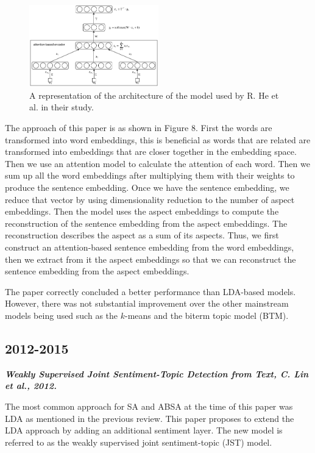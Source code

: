 \documentclass[conference]{IEEEtran}
\begin{document}
\begin{figure}[htbp]
\centerline{\includegraphics[keepaspectratio, width=0.5\textwidth]{pics/8.png}}
\caption{A representation of the architecture of the model used by R. He et al. in their study.}
\label{fig}
\end{figure}

The approach of this paper is as shown in Figure 8. First the words are transformed into word embeddings, this is beneficial as words that are related are transformed into embeddings that are closer together in the embedding space. Then we use an attention model to calculate the attention of each word. Then we sum up all the word embeddings after multiplying them with their weights to produce the sentence embedding. Once we have the sentence embedding, we reduce that vector by using dimensionality reduction to the number of aspect embeddings. Then the model uses the aspect embeddings to compute the reconstruction of the sentence embedding from the aspect embeddings. The reconstruction describes the aspect as a sum of its aspects. Thus, we first construct an attention-based sentence embedding from the word embeddings, then we extract from it the aspect embeddings so that we can reconstruct the sentence embedding from the aspect embeddings.

The paper correctly concluded a better performance than LDA-based models. However, there was not substantial improvement over the other mainstream models being used such as the $k$-means and the biterm topic model (BTM).\\

\subsection{2012-2015}

\textit{\textbf{Weakly Supervised Joint Sentiment-Topic Detection from Text, C. Lin et al., 2012.}}

The most common approach for SA and ABSA at the time of this paper was LDA as mentioned in the previous review. This paper proposes to extend the LDA approach by adding an additional sentiment layer. The new model is referred to as the weakly supervised joint sentiment-topic (JST) model.
\end{document}
